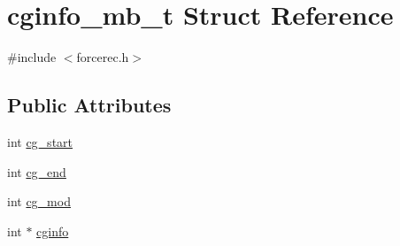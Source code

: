 \hypertarget{structcginfo__mb__t}{\section{cginfo\-\_\-mb\-\_\-t \-Struct \-Reference}
\label{structcginfo__mb__t}
}


{\ttfamily \#include $<$forcerec.\-h$>$}

\subsection*{\-Public \-Attributes}
\begin{DoxyCompactItemize}
\item 
int \hyperlink{structcginfo__mb__t_a110c304812de939d613c4dc274d164e3}{cg\-\_\-start}
\item 
int \hyperlink{structcginfo__mb__t_abf9f41f9e0eb92be25e5e8431d1c3325}{cg\-\_\-end}
\item 
int \hyperlink{structcginfo__mb__t_a0214e6e020e451ccd0c2b0e5c6b922ae}{cg\-\_\-mod}
\item 
int $\ast$ \hyperlink{structcginfo__mb__t_ae6e3e38c3174066a4a89046008f23b6f}{cginfo}
\end{DoxyCompactItemize}


